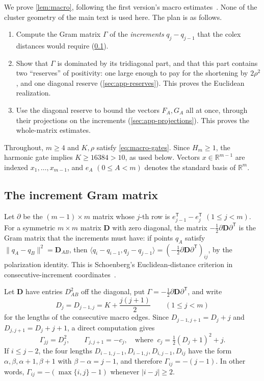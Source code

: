 \documentclass[11pt]{article}
\numberwithin{equation}{section}
\theoremstyle{definition}\newtheorem{definition}[theorem]{Definition}
\theoremstyle{remark}\newtheorem{remark}[theorem]{Remark}
\newcommand{\R}{\mathbb R}\newcommand{\N}{\mathbb N}
\newcommand{\ip}[2]{\langle #1,#2\rangle}
\newcommand{\norm}[1]{\lVert #1\rVert}
\newcommand{\T}{\mathsf T}\newcommand{\one}{\mathbf1}
\begin{document}
We prove \cref{lem:macro}, following the first version's macro
estimates~\cite[Lemmas~2--3]{Tripodo}. None of the cluster geometry of
the main text is used here. The plan is as follows.
\begin{enumerate}[leftmargin=2em,itemsep=1pt]
\item Compute the Gram matrix $\Gamma$ of the \emph{increments}
 $q_j-q_{j-1}$ that the colex distances would require
 (\cref{sec:app-gram}).
\item Show that $\Gamma$ is dominated by its tridiagonal part, and that
 this part contains two ``reserves'' of positivity: one large
 enough to pay for the shortening by $2\rho^2$, and one diagonal reserve
 (\cref{sec:app-reserves}). This proves the Euclidean realization.
\item Use the diagonal reserve to bound the vectors $F_A,G_A$ all at once,
 through their projections on the increments (\cref{sec:app-projections}).
 This proves the whole-matrix estimates.
\end{enumerate}
Throughout, $m\ge4$ and $K,\rho$ satisfy \eqref{eq:macro-gates}. Since
$H_m\ge1$, the harmonic gate implies $K\ge16384>10$, as used below. Vectors
$x\in\R^{m-1}$ are indexed $x_1,\dots,x_{m-1}$, and $e_A$ $(0\le A<m)$
denotes the standard basis of $\R^m$.

\subsection{The increment Gram matrix}\label{sec:app-gram}

Let $\partial$ be the $(m-1)\times m$ matrix whose $j$-th row is
$e_{j-1}^\T-e_j^\T$ $(1\le j<m)$. For a symmetric $m\times m$ matrix
$\mathbf D$ with zero diagonal, the matrix $-\frac12\partial\mathbf
D\partial^\T$ is the Gram matrix that the increments must have: if points
$q_A$ satisfy $\norm{q_A-q_B}^2=\mathbf D_{AB}$, then
$\ip{q_i-q_{i-1}}{q_j-q_{j-1}}=(-\frac12\partial\mathbf D\partial^\T)_{ij}$,
by the polarization identity. This is Schoenberg's Euclidean-distance
criterion in consecutive-increment coordinates~\cite[Theorem~1]{Schoenberg}.

Let $\mathbf D$ have entries $D_{AB}^2$ off the diagonal, put
$\Gamma=-\frac12\partial\mathbf D\partial^\T$, and write
\[
 D_j=D_{j-1,j}=K+\frac{j(j+1)}2\qquad(1\le j<m)
\]
for the lengths of the consecutive macro edges. Since
$D_{j-1,j+1}=D_j+j$ and $D_{j,j+1}=D_j+j+1$, a direct computation gives
\begin{equation}\label{eq:gram-entries}
 \Gamma_{jj}=D_j^2,\qquad
 \Gamma_{j,j+1}=-c_j,\quad\text{where }\ c_j=\tfrac12(D_j+1)^2+j.
\end{equation}
If $i\le j-2$, the four lengths $D_{i-1,j-1},D_{i-1,j},D_{i,j-1},D_{ij}$ have
the form $\alpha,\beta,\alpha+1,\beta+1$ with $\beta-\alpha=j-1$, and
therefore $\Gamma_{ij}=-(j-1)$. In other words, $\Gamma_{ij}=-(\max\{i,j\}-1)$
whenever $|i-j|\ge2$.
\end{document}
